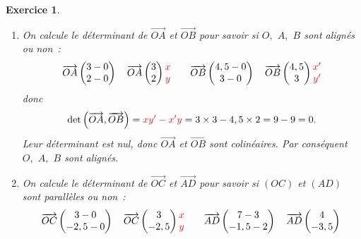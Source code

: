 \documentclass[10pt]{article}
\newtheorem{exo}{Exercice}
\begin{document}
\begin{exo}

\begin{enumerate}
\item On calcule le déterminant de $\overrightarrow{OA}$ et $\overrightarrow{OB}$ pour savoir si $O,$ $A,$ $B$ sont alignés ou non~:
\[\overrightarrow{OA}\begin{pmatrix} 3-0\\2-0 \end{pmatrix} \quad \overrightarrow{OA}\begin{pmatrix} 3\\2 \end{pmatrix}\begin{matrix} \textcolor{red}{
x}\\\textcolor{red}{
y} \end{matrix}\qquad
\overrightarrow{OB}\begin{pmatrix} 4,5-0\\3-0 \end{pmatrix}\quad \overrightarrow{OB}\begin{pmatrix} 4,5\\3 \end{pmatrix}\begin{matrix} \textcolor{red}{
x'}\\ \textcolor{red}{
y'}\end{matrix}\]
donc
\[\det\left(\overrightarrow{OA},\overrightarrow{OB}\right)=\textcolor{red}{
xy'-x'y}=3\times 3- 4,5\times 2=9-9=0.\] Leur déterminant est nul, donc $\overrightarrow{OA}$ et $\overrightarrow{OB}$ sont colinéaires. Par conséquent $O,$ $A,$ $B$ sont alignés.
\item On calcule le déterminant de $\overrightarrow{OC}$ et $\overrightarrow{AD}$ pour savoir si $(OC)$ et $(AD)$ sont parallèles ou non~:
\[\overrightarrow{OC}\begin{pmatrix} 3-0\\-2,5-0 \end{pmatrix}\quad \overrightarrow{OC}\begin{pmatrix} 3\\-2,5 \end{pmatrix}\begin{matrix} \textcolor{red}{
x}\\\textcolor{red}{
y} \end{matrix}\qquad
\overrightarrow{AD}\begin{pmatrix} 7-3\\-1,5-2 \end{pmatrix}\quad \overrightarrow{AD}\begin{pmatrix} 4\\-3,5 \end{pmatrix}\begin{matrix} \textcolor{red}{
}
\end{matrix}\]
\end{enumerate}
\end{exo}
\end{document}

